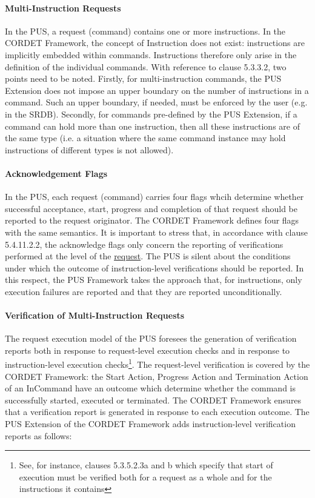 \documentclass{pnp_article}
\begin{document}
\paragraph{Multi-Instruction Requests}
In the PUS, a request (command) contains one or more instructions. In the CORDET Framework, the concept of Instruction does not exist: instructions are implicitly embedded within commands. Instructions therefore only arise in the definition of the individual commands. With reference to clause 5.3.3.2, two points need to be noted. Firstly, for multi-instruction commands, the PUS Extension does not impose an upper boundary on the number of instructions in a command. Such an upper boundary, if needed, must be enforced by the user (e.g. in the SRDB). Secondly, for commands pre-defined by the PUS Extension, if a command can hold more than one instruction, then all these instructions are of the same type (i.e. a situation where the same command instance may hold instructions of different types is not allowed). 

\paragraph{Acknowledgement Flags} In the PUS, each request (command) carries four flags whcih determine whether successful acceptance, start, progress and completion of that request should be reported to the request originator. The CORDET Framework defines four flags with the same semantics. It is important to stress that, in accordance with clause 5.4.11.2.2, the acknowledge flags only concern the reporting of verifications performed at the level of the \underline{request}. The PUS is silent about the conditions under which the outcome of instruction-level verifications should be reported. In this respect, the PUS Framework takes the  approach that, for instructions, only execution failures are reported and that they are reported unconditionally. 


\paragraph{Verification of Multi-Instruction Requests}
The request execution model of the PUS foresees the generation of verification reports both in response to request-level execution checks and in response to instruction-level execution checks\footnote{See, for instance, clauses 5.3.5.2.3a and b which specify that start of execution must be verified both for a request as a whole and for the instructions it contains}. The request-level verification is covered by the CORDET Framework: the Start Action, Progress Action and Termination Action of an InCommand have an outcome which determine whether the command is successfully started, executed or terminated. The CORDET Framework ensures that a verification report is generated in response to each execution outcome. The PUS Extension of the CORDET Framework adds instruction-level verification reports as follows:
\end{document}
